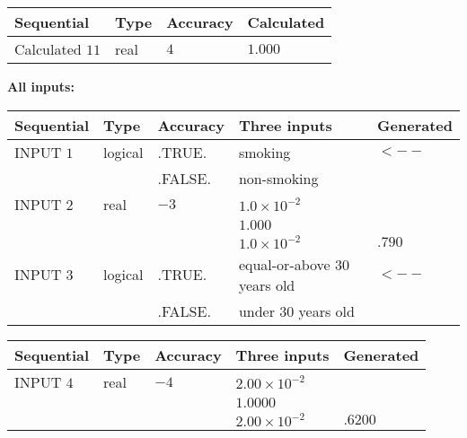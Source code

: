 \documentclass[12pt]{article}
\begin{document}
   
  
  
\noindent\begin{tabular}{|l|l|l|l|}
\hline
 Sequential & Type & Accuracy & Calculated \\ 
\hline
 
 
  Calculated $          11$ & real & $           4 $ & 
 $ 1.000 $ 
 \\  \hline  
 \end{tabular}
   
   
   
   
\noindent\vspace{0.1in}\hspace{-0.08in} {\textbf{\Large{All inputs: }}}
   
   
  
  
\noindent\begin{tabular}{|l|l|l|l|l|}
\hline
 Sequential & Type & Accuracy & Three inputs & Generated \\ 
\hline
 
 
  INPUT $           1$ & logical & .TRUE. & 
 smoking & 
  $ <-- $ 
  \\
  & & .FALSE. & 
  non-smoking & 
 \\  \hline  
 
 
  INPUT $           2$ & real & $          -3 $ & $
 1.0 \times 10^{-2}
  $ & \\
  & & &  $
 1.000
  $ & \\
  & & &  $
 1.0 \times 10^{-2}
 $ & $ .790 $ 
 \\  \hline  
 
 
  INPUT $           3$ & logical & .TRUE. & 
 equal-or-above 30 years old & 
  $ <-- $ 
  \\
  & & .FALSE. & 
  under 30 years old & 
 \\  \hline  
 \end{tabular}
   
   
  
  
\noindent\begin{tabular}{|l|l|l|l|l|}
\hline
 Sequential & Type & Accuracy & Three inputs & Generated \\ 
\hline
 
 
  INPUT $           4$ & real & $          -4 $ & $
 2.00 \times 10^{-2}
  $ & \\
  & & &  $
 1.0000
  $ & \\
  & & &  $
 2.00 \times 10^{-2}
 $ & $ .6200 $ 
 \\  \hline  
 \end{tabular}
   
\end{document}
